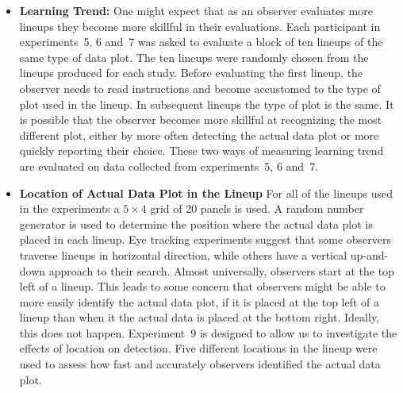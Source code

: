 \documentclass[10pt]{article}\usepackage[]{graphicx}\usepackage[]{xcolor}
\begin{document}
\begin{itemize}
\item{\bf Learning Trend:} One might expect that as an observer evaluates more lineups they  become more skillful in their evaluations. Each participant in  experiments~5, 6 and~7 was asked to evaluate a block of  ten lineups of the same type of data plot. The ten lineups were randomly chosen from the lineups  produced for each study. Before evaluating the first lineup, the observer needs to read instructions and become accustomed to the type of plot used in the lineup. In subsequent lineups  the type of plot is the same. It is possible that the observer becomes more skillful at recognizing the most different plot, either by more often detecting the actual data plot or more quickly reporting their choice. These two ways of measuring learning trend are evaluated on data collected from experiments~5, 6 and~7.

\item{\bf Location of Actual Data Plot in the Lineup} For all of the lineups used in the experiments a $5\times 4$ grid of 20 panels is used. A random number generator is used to determine the position where the actual data plot is placed in each lineup. Eye tracking experiments \citep{zhao:2012} suggest that some observers traverse lineups in horizontal direction, while others have a vertical up-and-down approach to their search. Almost universally, observers start at the top left of a lineup. This leads to some concern that observers might be able to more easily identify the actual data plot, if it is placed at the top left of a lineup than when it the actual data is placed at the bottom right.
Ideally, this does not happen. Experiment~9  is designed to allow us to investigate the effects of location on detection. Five different locations in the lineup were used to assess how fast and accurately observers identified the actual data plot.



\end{itemize}
\end{document}
